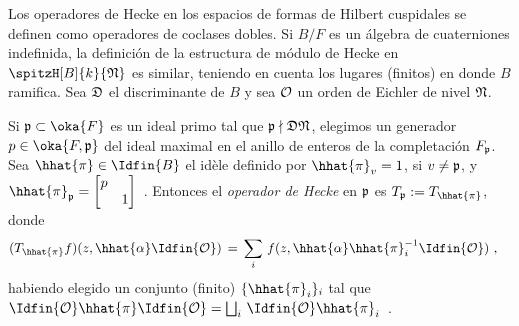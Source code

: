 Los operadores de Hecke en los espacios de formas de Hilbert cuspidales se
definen como operadores de coclases dobles. Si $B/F$ es un \'{a}lgebra de
cuaterniones indefinida, la definici\'{o}n de la estructura de m\'{o}dulo de
Hecke en $\spitzH[B]{k}{\frak{N}}$ es similar, teniendo en cuenta los lugares
(finitos) en donde $B$ ramifica. Sea $\frak{D}$ el discriminante de $B$ y sea
$\cal{O}$ un orden de Eichler de nivel $\frak{N}$.

\begin{defHeckeParaIndefinidos}\label{def:heckeparaindefinidos}
	Si $\frak{p}\subset\oka{F}$ es un ideal primo tal que
	$\frak{p}\nmid\frak{D}\frak{N}$, elegimos un generador
	$p\in\oka{F,\frak{p}}$ del ideal maximal en el anillo de enteros de
	la completaci\'{o}n $F_{\frak{p}}$. Sea $\hhat{\pi}\in\Idfin{B}$ el
	id\`{e}le definido por $\hhat{\pi}_{v}=1$, si $v\not =\frak{p}$, y
	\begin{math}
		\hhat{\pi}_{\frak{p}}=\begin{bmatrix} p & \\ & 1 \end{bmatrix}
	\end{math}~.
	Entonces el \emph{operador de Hecke} en $\frak{p}$ es
	$T_{\frak{p}}:=T_{\hhat{\pi}}$, donde
	\begin{align*}
		(T_{\hhat{\pi}}f)(z,\hhat{\alpha}\Idfin{\cal{O}})
			& \,=\,\sum_{i}\,f(z,\hhat{\alpha}\hhat{\pi}_{i}^{-1}
							\Idfin{\cal{O}})
		\text{ ,}
	\end{align*}
	habiendo elegido un conjunto (finito) $\{\hhat{\pi}_{i}\}_{i}$ tal que
	\begin{math}
		\Idfin{\cal{O}}\hhat{\pi}\Idfin{\cal{O}}=
			\bigsqcup_{i}\,\Idfin{\cal{O}}\hhat{\pi}_{i}
	\end{math}~.
\end{defHeckeParaIndefinidos}

